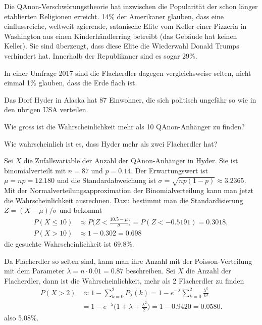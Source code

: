 Die QAnon-Verschwörungstheorie hat inzwischen die Popularität
der schon länger etablierten Religionen erreicht.
14\% der Amerikaner glauben, dass eine einflussreiche, weltweit agierende,
satanische Elite vom Keller einer Pizzeria in Washington
aus einen Kinderhändlerring betreibt (das Gebäude hat keinen Keller).
Sie sind überzeugt, dass diese Elite die Wiederwahl Donald Trumps
verhindert hat.
Innerhalb der Republikaner sind es sogar 29\%.

In einer Umfrage 2017 sind die Flacherdler dagegen vergleichsweise
selten, nicht einmal 1\% glauben, dass die Erde flach ist.

Das Dorf Hyder in Alaska hat 87 Einwohner, die sich politisch ungefähr
so wie in den übrigen USA verteilen.
\begin{teilaufgaben}
\item
Wie gross ist die Wahrscheinlichkeit mehr als 10 QAnon-Anhänger zu finden?
\item
Wie wahrscheinlich ist es, dass Hyder mehr als zwei Flacherdler hat?
\end{teilaufgaben}

\begin{loesung}
\begin{teilaufgaben}
\item
Sei $X$ die Zufallsvariable der Anzahl der QAnon-Anhänger in Hyder.
Sie ist binomialverteilt mit $n=87$ und $p=0.14$.
Der Erwartungswert ist $\mu=np=12.180$ und die Standardabweichung
ist $\sigma=\sqrt{np(1-p)}\approx 3.2365$.
Mit der Normalverteilungsapproximation der Binomialverteilung
kann man jetzt die Wahrscheinlichkeit ausrechnen.
Dazu bestimmt man die Standardisierung $Z=(X-\mu)/\sigma$ und
bekommt
\begin{align*}
P(X\le 10)
&\approx
P\biggl(Z < \frac{10.5-\mu}{\sigma}\biggr)
=
P(Z < -0.5191) = 0.3018,
\\
P(X > 10)
&\approx
1-0.302 = 0.698
\end{align*}
die gesuchte Wahrscheinlichkeit ist $69.8\%$.
\item
Da Flacherdler so selten sind, kann man ihre Anzahl mit der
Poisson-Verteilung mit dem Parameter $\lambda = n\cdot 0.01=0.87$
beschreiben.
Sei $X$ die Anzahl der Flacherdler, dann ist die Wahrscheinlichkeit,
mehr als 2 Flacherdler zu finden
\begin{align*}
P(X>2)
&\approx
1-\sum_{k=0}^2 P_\lambda(k)
=
1-e^{-\lambda} \sum_{k=0}^2 \frac{\lambda^k}{k!}
\\
&=
1-e^{-\lambda}\biggl(1+\lambda+\frac{\lambda^2}{2}\biggr)
=
1- 0.9420
=
0.0580.
\end{align*}
also 5.08\%.
\qedhere
\end{teilaufgaben}
\end{loesung}

